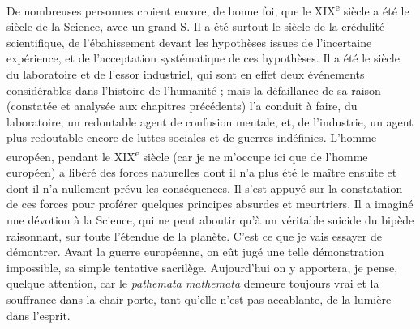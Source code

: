 \documentclass[french,twoside]{book} %
\newcommand\chaptercont{} %
\renewcommand\chaptercont{} %
\begin{document}
\chaptercont
\noindent De nombreuses personnes croient encore, de bonne foi, que le XIX\textsuperscript{e} siècle a été le siècle de la Science, avec un grand S. Il a été surtout le siècle de la crédulité scientifique, de l’ébahissement devant les hypothèses issues de l’incertaine expérience, et de l’acceptation systématique de ces hypothèses. Il a été le siècle du laboratoire et de l’essor industriel, qui sont en effet deux événements considérables dans l’histoire de l’humanité ; mais la défaillance de sa raison (constatée et analysée aux chapitres précédents) l’a conduit à faire, du laboratoire, un redoutable agent de confusion mentale, et, de l’industrie, un agent plus redoutable encore de luttes sociales et de guerres indéfinies. L’homme européen, pendant le XIX\textsuperscript{e} siècle (car je ne m’occupe ici que de l’homme européen) a libéré des forces naturelles dont il n’a plus été le maître ensuite et dont il n’a nullement prévu les conséquences. Il s’est appuyé sur la constatation de ces forces pour proférer quelques principes absurdes et meurtriers. Il a imaginé une dévotion à la Science, qui ne peut aboutir qu’à un véritable suicide du bipède raisonnant, sur toute l’étendue de la planète. C’est ce que je vais essayer de démontrer. Avant la guerre européenne, on eût jugé une telle démonstration impossible, sa simple tentative sacrilège. Aujourd’hui on y apportera, je pense, quelque attention, car le {\itshape pathemata mathemata} demeure toujours vrai et la souffrance dans la chair porte, tant qu’elle n’est pas accablante, de la lumière dans l’esprit.\par
\end{document}

